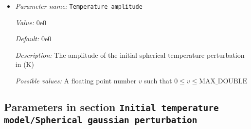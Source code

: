 \begin{itemize}
{\it Possible values:} A floating point number $v$ such that $-\text{MAX\_DOUBLE} \leq v \leq \text{MAX\_DOUBLE}$
\item {\it Parameter name:} {\tt Temperature amplitude}
\label{parameters:Initial temperature model/Solidus/Perturbation/Temperature amplitude}


{\it Value:} 0e0


{\it Default:} 0e0


{\it Description:} The amplitude of the initial spherical temperature perturbation in (K)


{\it Possible values:} A floating point number $v$ such that $0 \leq v \leq \text{MAX\_DOUBLE}$
\end{itemize}

\subsection{Parameters in section \tt Initial temperature model/Spherical gaussian perturbation}
\label{parameters:Initial_20temperature_20model/Spherical_20gaussian_20perturbation}

